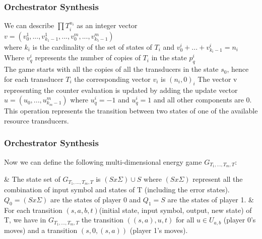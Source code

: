 \documentclass{beamer}
\begin{document}
\begin{frame}
\frametitle{Orchestrator Synthesis}
We can describe $\prod T_{i}^{n_{i}}$ as an integer vector\\
$v=(v_{0}^{1},...,v_{k_{1}-1}^{1},...,v_{0}^{m},...,v_{k_{5}-1}^{m})$\\
where $k_{i}$ is the cardinality of the set of states of $T_{i}$ and $v_{0}^{i}+...+v_{k_{i}-1}^{i}=n_{i}$\\
Where $v^{i}_{q}$ represents the number of copies of $T_{i}$ in the state $p_{q}^{i}$\\
The game starts with all the copies of all the transducers in the state $s_{0}$, hence for each transducer $T_{i}$ the corresponding vector $v_{i} $ is $(n_{i},0)_{i}$  \newline \newline
The vector v representing the counter evaluation is updated by adding the update vector $u=(u_{0},...,u_{k_{m}-1}^{m})$ where $u_{q}^{i} = -1$ and $u_{q}^{i} = 1$ and all other components are 0. This operation represents the transition between two states of one of the available resource transducers.

\end{frame}

\begin{frame}[fragile]
\frametitle{Orchestrator Synthesis}
Now we can define the following multi-dimensional energy game $G_{T_{1},...,T_{m},T}$:
\begin{easylist}
& The state set of $G_{T_{1},...,T_{m},T}$ is $(S x \Sigma )\cup S$ where 
$(S x \Sigma )$ represent all the combination of input symbol and states of T (including the error states). $Q_{0} = (S x \Sigma ) $ are the states of player 0 and $Q_{1} = S$ are the states of player 1.
& For each transition $(s,a,b,t)$(initial state, input symbol, output, new state) of T, we have in $G_{T_{1},...,T_{m},T}$ the transition $((s,a),u,t)$ for all  $u \in U_{a,b}$ (player 0's moves) and a transition $(s,0,(s,a))$ (player 1's moves).

\end{easylist}
\end{frame}



\end{document}

